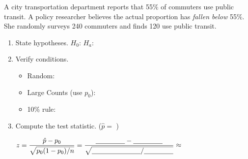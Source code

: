 \documentclass[10pt]{article}
\begin{document}
\namedateperiod

\vspace{0.15in}

A city transportation department reports that 55\% of commuters use public transit. A policy
researcher believes the actual proportion has \emph{fallen below} 55\%. She randomly surveys
240 commuters and finds 120 use public transit.

\begin{enumerate}
  \item State hypotheses.
        $H_0$: \blank{5cm} \quad $H_a$: \blank{5cm}

  \item Verify conditions.
        \begin{itemize}
          \item Random: \blank{6cm}
          \item Large Counts (use $p_0$): \blank{7cm}
          \item 10\% rule: \blank{5cm}
        \end{itemize}

  \item Compute the test statistic. \quad ($\hat p = $ \blank{2cm})

        $z = \dfrac{\hat p - p_0}{\sqrt{p_0(1-p_0)/n}} = \dfrac{\blank{1.5cm} - \blank{1.5cm}}{\sqrt{\blank{2.5cm}/\blank{1.5cm}}} \approx$ \blank{2cm}
\end{enumerate}
\end{document}
